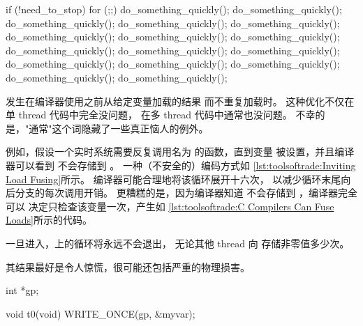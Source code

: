 \begin{description}[labelsep=.4em]
\begin{listing}
\begin{fcvlabel}
\begin{VerbatimLL}[commandchars=\\\[\]]
if (!need_to_stop)
	for (;;) {\lnlbl[loop:b]
		do_something_quickly();
		do_something_quickly();
		do_something_quickly();
		do_something_quickly();
		do_something_quickly();
		do_something_quickly();
		do_something_quickly();
		do_something_quickly();
		do_something_quickly();
		do_something_quickly();
		do_something_quickly();
		do_something_quickly();
		do_something_quickly();
		do_something_quickly();
		do_something_quickly();
		do_something_quickly();
	}\lnlbl[loop:e]
\end{VerbatimLL}
\end{fcvlabel}
\caption{C 编译器可以融合加载}
\label{lst:toolsoftrade:C Compilers Can Fuse Loads}
\end{listing}

\item[加载融合（Load fusing）] 发生在编译器使用之前从给定变量加载的结果
而不重复加载时。
这种优化不仅在单 thread 代码中完全没问题，
在多 thread 代码中通常也没问题。
不幸的是，"通常"这个词隐藏了一些真正恼人的例外。

例如，假设一个实时系统需要反复调用名为
 的函数，直到变量
 被设置，并且编译器可以看到
 不会存储到 。
一种（不安全的）编码方式如
\cref{lst:toolsoftrade:Inviting Load Fusing}所示。
编译器可能合理地将该循环展开十六次，
以减少循环末尾向后分支的每次调用开销。
更糟糕的是，因为编译器知道 
不会存储到 ，编译器完全可以
决定只检查该变量一次，产生如
\cref{lst:toolsoftrade:C Compilers Can Fuse Loads}所示的代码。
\begin{fcvref}
一旦进入，上的循环将永远不会退出，
无论其他 thread 向  存储非零值多少次。
\end{fcvref}
其结果最好是令人惊慌，很可能还包括严重的物理损害。

\begin{listing}
\begin{fcvlabel}
\begin{VerbatimLL}[commandchars=\\\[\]]
int *gp; \lnlbl[gp]

void t0(void)
{
	WRITE_ONCE(gp, &myvar); \lnlbl[wgp]
}


\end{VerbatimLL}
\end{fcvlabel}
\end{listing}
\end{description}

